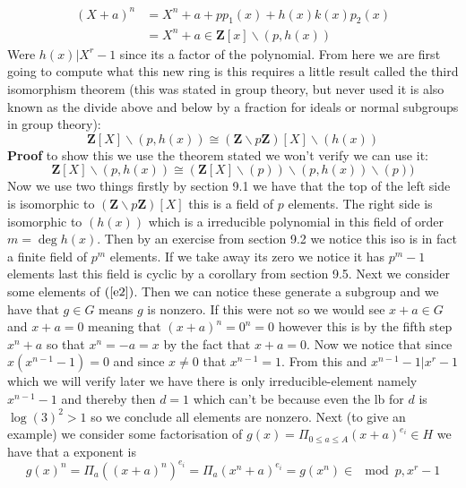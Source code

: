 \begin{enumerate}
\begin{equation}
    \begin{split}
        (X+a)^n &= X^n+a+pp_1(x)+h(x)k(x)p_2(x)\\
                &= X^n+a\in \mathbf{Z}[x]\backslash(p,h(x))
                \label{e3}
    \end{split}
\end{equation}
Were $h(x)|X^r-1$ since its a factor of the polynomial. From here we are first going to compute what this new ring is this requires a little result called the third isomorphism theorem (this was stated in group theory, but never used it is also known as the divide above and below by a fraction for ideals or normal subgroups in group theory): 
\begin{equation}
    \mathbf{Z}[X]\backslash(p,h(x))\cong (\mathbf{Z}\backslash p\mathbf{Z})[X]\backslash(h(x))
\end{equation}
\textbf{Proof} to show this we use the theorem stated we won't verify we can use it:
\begin{equation*}
    \mathbf{Z}[X]\backslash(p,h(x))\cong (\mathbf{Z}[X]\backslash (p))\backslash (p,h(x))\backslash (p)) 
\end{equation*}
Now we use two things firstly by section 9.1 we have that the top of the left side is isomorphic to $(\mathbf{Z}\backslash p \mathbf{Z})[X]$ this is a field of $p$ elements. The right side is isomorphic to $(h(x))$ which is a irreducible polynomial in this field of order $m=\deg{h(x)}$. Then by an exercise from section 9.2 we notice this iso is in fact a finite field of $p^m$ elements. If we take away its zero we notice it has $p^m-1$ elements last this field is cyclic by a corollary from section 9.5. Next we consider some elements of $(\ref{e2})$. Then we can notice these generate a subgroup and we have that $g\in G$  means $g$ is nonzero. If this were not so we would see $x+a\in G$ and $x+a=0$ meaning that $(x+a)^n=0^n=0$ however this is by the fifth step $x^n+a$ so that $x^n=-a=x$ by the fact that $x+a=0$. Now we notice that since $x(x^{n-1}-1)=0$ and since $x\neq 0$ that $x^{n-1}=1$. From this and  $x^{n-1}-1|x^r-1$  which we will verify later we have there is only
irreducible-element namely $x^{n-1}-1$ and thereby then $d=1$ which can't be because even the lb for $d$ is $\log(3)^2>1$ so we conclude all elements are nonzero. Next (to give an example) we consider some factorisation of $g(x)=\Pi_{0\leq a \leq A}(x+a)^{e_i}\in H$ we have that a exponent is 
\begin{equation}
g(x)^n = \Pi_a((x+a)^n)^{e_i}=\Pi_a(x^n+a)^{e_i} = g(x^n) \in \mod {p,x^r-1}

\end{equation}
\end{enumerate}
